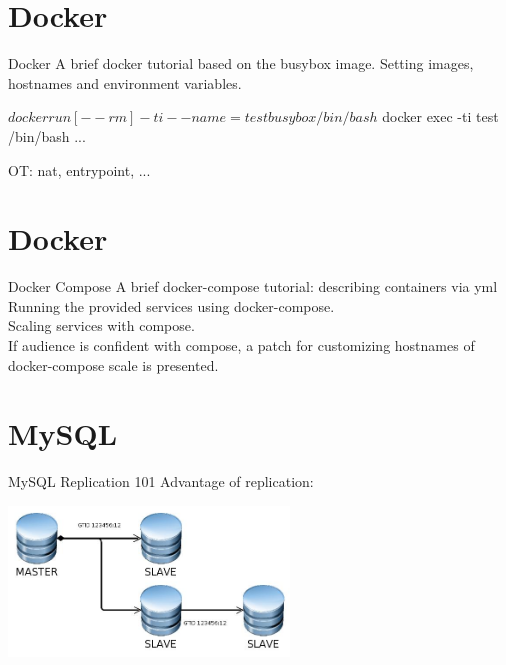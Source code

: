 \documentclass{beamer}[10]
\begin{document}
%
%
\section{Docker}
\begin{pyframe}{Docker}
A brief docker tutorial based
on the busybox image.
Setting images, hostnames and environment variables.
\begin{bashcode}
$ docker run [--rm] -ti --name=test busybox /bin/bash
$ docker exec -ti  test /bin/bash
...
\end{bashcode}
OT: nat, entrypoint, ...
\end{pyframe}

\section{Docker}
\begin{pyframe}{Docker Compose}
A brief docker-compose tutorial:
describing containers via yml
\\
Running the provided services
using docker-compose.
\\
Scaling services with compose.
\\
If audience is confident with compose, a patch
for customizing hostnames of docker-compose scale is presented.

\end{pyframe}

%
%
\section{MySQL}
\begin{pyframe}{MySQL Replication 101}
Advantage of replication:
\includegraphics[height=4cm]{images/mysql-propagate-gtid.jpg}
\end{pyframe}
\end{document}

